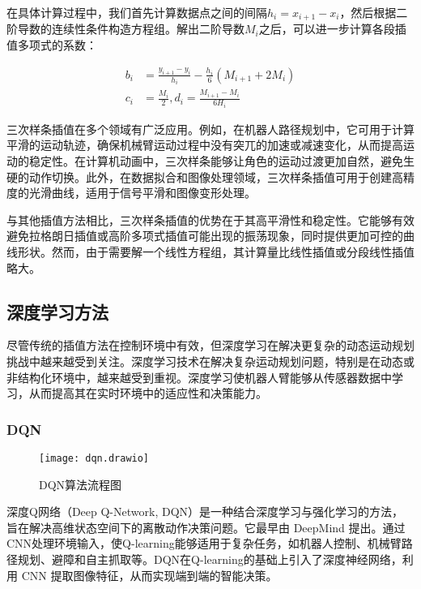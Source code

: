 在具体计算过程中，我们首先计算数据点之间的间隔$h_{i} = x_{i+1} - x_{i}$，然后根据二阶导数的连续性条件构造方程组。解出二阶导数$M_{i}$之后，可以进一步计算各段插值多项式的系数：

\begin{equation}
	\label{equ:Cubic Spline Interpolation 2}
	\begin{split}
		b_{i} &= \frac{y_{i+1} - y_{i}}{h_{i}} - \frac{h_{i}}{6}(M_{i+1} + 2M_{i})   \\
		c_{i} &= \frac{M_{i}}{2} ,d_{i} = \frac{M_{i+1} - M_{i}}{6H_{i}}
	\end{split}
\end{equation}

三次样条插值在多个领域有广泛应用。例如，在机器人路径规划中，它可用于计算平滑的运动轨迹，确保机械臂运动过程中没有突兀的加速或减速变化，从而提高运动的稳定性。在计算机动画中，三次样条能够让角色的运动过渡更加自然，避免生硬的动作切换。此外，在数据拟合和图像处理领域，三次样条插值可用于创建高精度的光滑曲线，适用于信号平滑和图像变形处理。

与其他插值方法相比，三次样条插值的优势在于其高平滑性和稳定性。它能够有效避免拉格朗日插值或高阶多项式插值可能出现的振荡现象，同时提供更加可控的曲线形状。然而，由于需要解一个线性方程组，其计算量比线性插值或分段线性插值略大。


\subsection{深度学习方法}
尽管传统的插值方法在控制环境中有效，但深度学习在解决更复杂的动态运动规划挑战中越来越受到关注。深度学习技术在解决复杂运动规划问题，特别是在动态或非结构化环境中，越来越受到重视。深度学习使机器人臂能够从传感器数据中学习，从而提高其在实时环境中的适应性和决策能力。

\subsubsection{DQN}
 \begin{figure}[htb]
	\texttt{[image: dqn.drawio]}
	\caption[DQN算法流程图]{DQN算法流程图} %
	\label{fig:dqn.drawio}
\end{figure}
深度Q网络\cite{mnih2015human}（Deep Q-Network, DQN）是一种结合深度学习与强化学习的方法，旨在解决高维状态空间下的离散动作决策问题。它最早由 DeepMind 提出。通过CNN处理环境输入，使Q-learning能够适用于复杂任务，如机器人控制、机械臂路径规划、避障和自主抓取等。DQN在Q-learning的基础上引入了深度神经网络，利用 CNN 提取图像特征，从而实现端到端的智能决策。

